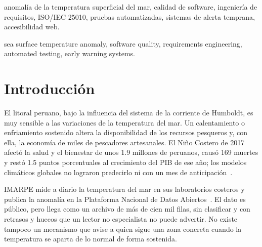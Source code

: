 \documentclass[conference,a4paper]{IEEEtran}
\begin{document}
\begin{IEEEkeywords}
anomalía de la temperatura superficial del mar, calidad de software, ingeniería de requisitos, ISO/IEC 25010, pruebas automatizadas, sistemas de alerta temprana, accesibilidad web.
\end{IEEEkeywords}

\renewcommand{\abstractname}{Abstract}
\begin{abstract}
The Peruvian Sea Institute (IMARPE) publishes the daily sea surface temperature anomaly (SSTA) of its coastal laboratories as open data, in a format only specialists can use. This progress report presents OLA, a web application that classifies the thermal state of Peru's 10 coastal laboratories as warm, neutral or cold, displays it on an interactive map, charts and compares their history since 1970, estimates the short-term trend with two simple models, and emails subscribed users when a zone shows a sustained anomaly. The project followed Scrum and a quality process based on IEEE~830, ISO/IEC~25010 and a layered testing strategy. All eight functional requirements are implemented and verified by 943 automated tests, with 95\,\% backend coverage and no serious WCAG~2.2~AA violations.
\end{abstract}

\begin{IEEEkeywords}
sea surface temperature anomaly, software quality, requirements engineering, automated testing, early warning systems.
\end{IEEEkeywords}

\section{Introducción}

El litoral peruano, bajo la influencia del sistema de la corriente de Humboldt, es muy sensible a las variaciones de la temperatura del mar. Un calentamiento o enfriamiento sostenido altera la disponibilidad de los recursos pesqueros y, con ella, la economía de miles de pescadores artesanales. El Niño Costero de 2017 afectó la salud y el bienestar de unos 1.9 millones de peruanos, causó 169 muertes y restó 1.5 puntos porcentuales al crecimiento del PIB de ese año; los modelos climáticos globales no lograron predecirlo ni con un mes de anticipación~\cite{yglesias2023}.

IMARPE mide a diario la temperatura del mar en sus laboratorios costeros y publica la anomalía en la Plataforma Nacional de Datos Abiertos~\cite{imarpe_dataset}. El dato es público, pero llega como un archivo de más de cien mil filas, sin clasificar y con retrasos y huecos que un lector no especialista no puede advertir. No existe tampoco un mecanismo que avise a quien sigue una zona concreta cuando la temperatura se aparta de lo normal de forma sostenida.
\end{document}
